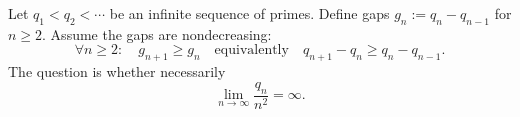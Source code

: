 Let $q_1<q_2<\cdots$ be an infinite sequence of primes. Define gaps $g_n:=q_n-q_{n-1}$ for $n\ge 2$.
Assume the gaps are nondecreasing:
\[
\forall n\ge 2:\quad g_{n+1}\ge g_n\quad\text{equivalently}\quad q_{n+1}-q_n\ge q_n-q_{n-1}.
\]
The question is whether necessarily
\[
\lim_{n\to\infty}\frac{q_n}{n^2}=\infty.
\]
